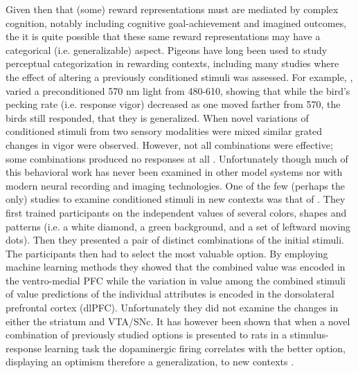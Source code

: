 \documentclass[doc,12pt]{apa}        %
\begin{document}
Given then that (some) reward representations must are mediated by complex cognition, notably including cognitive goal-achievement and imagined outcomes,  the it is quite possible that these same reward representations may have a categorical (i.e. generalizable) aspect.  Pigeons have long been used to study perceptual categorization in rewarding contexts, including many studies where the effect of altering a previously conditioned stimuli was assessed.  For example, , varied a preconditioned 570 nm light from 480-610, showing that while the bird's pecking rate (i.e. response vigor) decreased as one moved farther from 570, the birds still responded, that they is generalized.  When novel variations of conditioned stimuli from two sensory modalities were mixed similar grated changes in vigor were observed. However, not all combinations were effective; some combinations produced no responses at all \cite{Blough:2001p8408,Simmons:2008p8405,Urcuioli:2001p8359}.  Unfortunately though much of this behavioral work has never been examined in other model systems nor with modern neural recording and imaging technologies.  One of the few (perhaps the only) studies to examine conditioned stimuli in new contexts was that of .   They first trained participants on the independent values of several colors, shapes and patterns (i.e. a white diamond, a green background, and a set of leftward moving dots).  Then they presented a pair of distinct combinations of the initial stimuli.  The participants then had to select the most valuable option.  By employing machine learning methods they showed that the combined value was encoded in the ventro-medial PFC while the variation in value among the combined stimuli of value predictions of the individual attributes is encoded in the dorsolateral prefrontal cortex (dlPFC).  Unfortunately they did not examine the changes in either the striatum and VTA/SNc.  It has however been shown that when a novel combination of previously studied options is presented to rats in a stimulus-response learning task the dopaminergic firing correlates with the better option, displaying an optimism therefore a generalization, to new contexts \cite{Roesch:2007p2519}.

\end{document}
